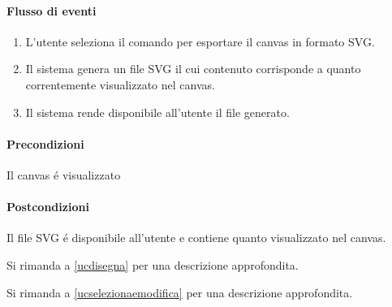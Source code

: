 \paragraph{Flusso di eventi}
\begin{enumerate}
\item L'utente seleziona il comando per esportare il canvas in formato SVG.
\item Il sistema genera un file SVG il cui contenuto corrisponde a quanto correntemente visualizzato nel canvas.
\item Il sistema rende disponibile all'utente il file generato.
\end{enumerate}
\paragraph{Precondizioni} Il canvas \'e visualizzato
\paragraph{Postcondizioni} Il file SVG \'e disponibile all'utente e contiene quanto visualizzato nel canvas.

Si rimanda a \ref{ucdisegna} per una descrizione approfondita.

Si rimanda a \ref{ucselezionaemodifica} per una descrizione approfondita.

